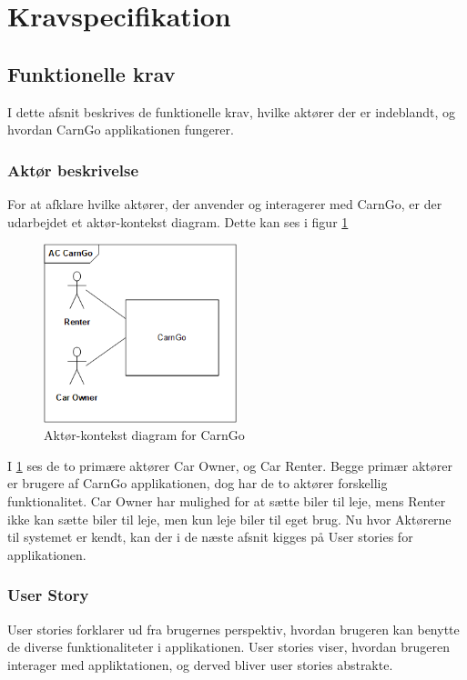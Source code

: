\documentclass[Rapport/Rapport_main.tex]{subfiles}
\begin{document}
\section{Kravspecifikation}


\subsection{Funktionelle krav}
I dette afsnit beskrives de funktionelle krav, hvilke aktører der er indeblandt, og hvordan CarnGo applikationen fungerer.

\subsubsection{Aktør beskrivelse}

For at afklare hvilke aktører, der anvender og interagerer med CarnGo, er der udarbejdet et aktør-kontekst diagram. Dette kan ses i figur \ref{fig:actor_context}
\begin{figure}[H]
    \centering
    \includegraphics[width=0.5\textwidth]{Kravspecifikation/Funktionelle_krav/ActorContext/graphics/AC_CarnGo.png}
    \caption{Aktør-kontekst diagram for CarnGo}
    \label{fig:actor_context}
\end{figure}

I \ref{fig:actor_context} ses de to primære aktører Car Owner, og Car Renter. Begge primær aktører er brugere af CarnGo applikationen, dog har de to aktører forskellig funktionalitet. Car Owner har mulighed for at sætte biler til leje, mens Renter ikke kan sætte biler til leje, men kun leje biler til eget brug.
Nu hvor Aktørerne til systemet er kendt, kan der i de næste afsnit kigges på User stories for applikationen. 

\newpage
\subsubsection{User Story}
User stories forklarer ud fra brugernes perspektiv, hvordan brugeren kan benytte de diverse funktionaliteter i applikationen. User stories viser, hvordan brugeren interager med appliktationen, og derved bliver user stories abstrakte.
\end{document}
